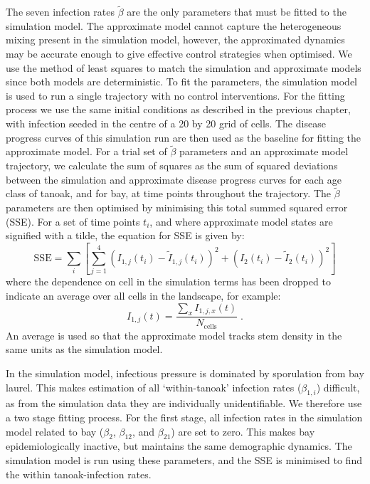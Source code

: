 The seven infection rates $\tilde{\beta}$ are the only parameters that must be fitted to the simulation model. The approximate model cannot capture the heterogeneous mixing present in the simulation model, however, the approximated dynamics may be accurate enough to give effective control strategies when optimised. We use the method of least squares to match the simulation and approximate models since both models are deterministic. To fit the parameters, the simulation model is used to run a single trajectory with no control interventions. For the fitting process we use the same initial conditions as described in the previous chapter, with infection seeded in the centre of a 20 by 20 grid of cells. The disease progress curves of this simulation run are then used as the baseline for fitting the approximate model. For a trial set of $\tilde{\beta}$ parameters and an approximate model trajectory, we calculate the sum of squares as the sum of squared deviations between the simulation and approximate disease progress curves for each age class of tanoak, and for bay, at time points throughout the trajectory. The $\tilde{\beta}$ parameters are then optimised by minimising this total summed squared error (SSE). For a set of time points $t_i$, and where approximate model states are signified with a tilde, the equation for SSE is given by:
\begin{equation}
    \mathrm{SSE} = \sum_{i}\left[\sum_{j=1}^4\left(I_{1,j}(t_i) - \tilde{I}_{1,j}(t_i)\right)^2 + \left(I_{2}(t_i) - \tilde{I}_{2}(t_i)\right)^2\right]
\end{equation}
where the dependence on cell in the simulation terms has been dropped to indicate an average over all cells in the landscape, for example:
\begin{equation}
    I_{1,j}(t) = \frac{\sum_xI_{1,j,x}(t)}{N_\textrm{cells}}\;.
\end{equation}
An average is used so that the approximate model tracks stem density in the same units as the simulation model.

In the simulation model, infectious pressure is dominated by sporulation from bay laurel. This makes estimation of all `within-tanoak' infection rates ($\beta_{1,i}$) difficult, as from the simulation data they are individually unidentifiable. We therefore use a two stage fitting process. For the first stage, all infection rates in the simulation model related to bay ($\beta_2$, $\beta_{12}$, and $\beta_{21}$) are set to zero. This makes bay epidemiologically inactive, but maintains the same demographic dynamics. The simulation model is run using these parameters, and the SSE is minimised to find the within tanoak-infection rates.

